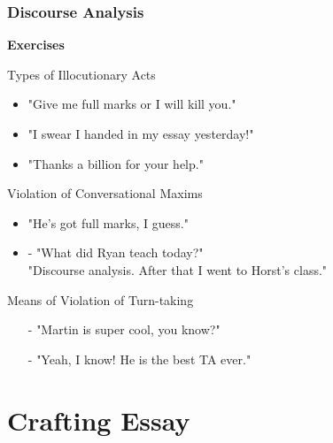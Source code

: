 \documentclass{beamer}
\begin{document}
\begin{frame}
\frametitle{Discourse Analysis}
\textbf{Exercises}
\begin{block}{Types of Illocutionary Acts}
\begin{itemize}
\item "Give me full marks or I will kill you."
\item "I swear I handed in my essay yesterday!"
\item "Thanks a billion for your help."
\end{itemize}
\end{block}

\begin{block}{Violation of Conversational Maxims}
\begin{itemize}
\item "He's got full marks, I guess."
\item - "What did Ryan teach today?"\\
\quad "Discourse analysis. After that I went to Horst's class."
\end{itemize}
\end{block}

\begin{block}{Means of Violation of Turn-taking}
\begin{itemize}
\item[-] "Martin is super cool, you know?"
\item[-] "Yeah, I know! He is the best TA ever."
\end{itemize}
\end{block}

\end{frame}
\section{Crafting Essay}
\end{document}
